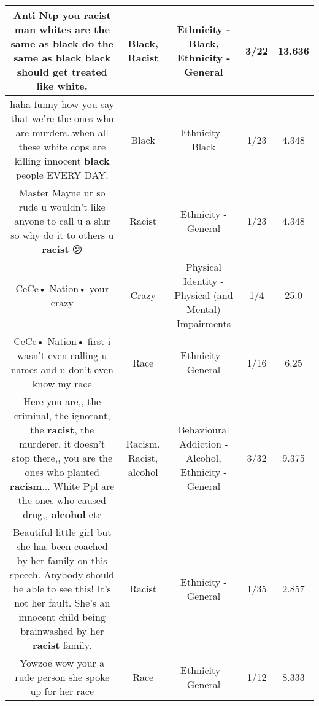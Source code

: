 \documentclass[11pt]{article}
\newlength\mylength
\begin{document}
\begin{center}
\begin{longtable}{|C{.65\mylength}|C{.30\mylength}|C{.12\mylength}|C{.12\mylength}|C{.12\mylength}|}
  \small Anti Ntp you \textbf{racist} man whites are the same as \textbf{black} do the same as \textbf{black} \textbf{black} should get treated like white.\normalsize   & Black, Racist & Ethnicity - Black, Ethnicity - General & 3/22 & 13.636 \\  \hline
  \small haha funny how you say that we're the ones who are murders..when all these white cops are killing innocent \textbf{black} people EVERY DAY.\normalsize   & Black & Ethnicity - Black & 1/23 & 4.348 \\  \hline
  \small Master Mayne ur so rude u wouldn't like anyone to call u a slur so why do it to others u \textbf{racist} 😕\normalsize   & Racist & Ethnicity - General & 1/23 & 4.348 \\  \hline
  \small CeCe• Nation• your crazy\normalsize   & Crazy & Physical Identity - Physical (and Mental) Impairments & 1/4 & 25.0 \\  \hline
  \small CeCe• Nation• first i wasn't even calling u names and u don't even know my race\normalsize   & Race & Ethnicity - General & 1/16 & 6.25 \\  \hline
  \small Here you are,, the criminal, the ignorant, the \textbf{racist}, the murderer, it doesn't stop there,, you are the ones who planted \textbf{racism}... White Ppl are the ones who caused  drug,, \textbf{alcohol}  etc\normalsize   & Racism, Racist, alcohol & Behavioural Addiction - Alcohol, Ethnicity - General & 3/32 & 9.375 \\  \hline
  \small Beautiful little girl but she has been coached by her family on this speech. Anybody should be able to see this! It's not her fault. She's an innocent child being brainwashed by her \textbf{racist} family.\normalsize   & Racist & Ethnicity - General & 1/35 & 2.857 \\  \hline
  \small Yowzoe wow your a rude person she spoke up for her race\normalsize   & Race & Ethnicity - General & 1/12 & 8.333 \\  \hline

\end{longtable}
\end{center}
\end{document}
